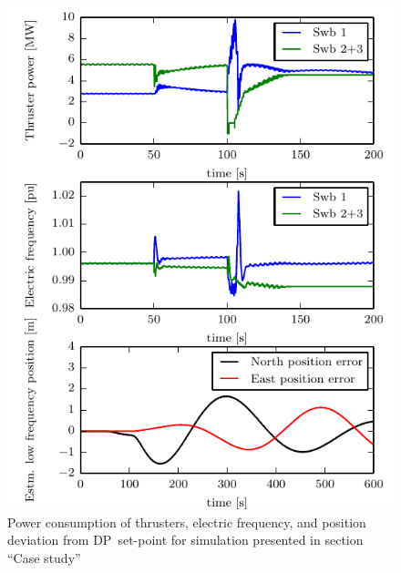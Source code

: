\documentclass[twocolumn,10pt]{asme2e}
\begin{document}
\begin{figure}
\includegraphics{figures/omae}
\caption{Power consumption of thrusters, electric frequency, and position deviation from DP~set-point for simulation presented in section ``Case study''}
\label{fig:caseplot}
\end{figure}


\end{document}
